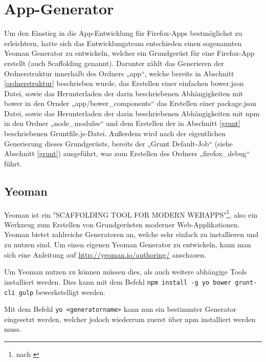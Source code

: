 \renewcommand{\chaptertitle}{App-Generator}

\chapter{\chaptertitle} %

\label{AppGenerator} %


Um den Einstieg in die App-Entwicklung für Firefox-Apps bestmöglichst zu erleichtern, hatte sich das Entwicklungsteam entschieden einen sogenannten Yeoman Generator zu entwickeln, welcher ein Grundgerüst für eine Firefox-App erstellt (auch Scaffolding genannt).
Darunter zählt das Generieren der Ordnerstruktur innerhalb des Ordners „app“, welche bereits in Abschnitt \ref{ordnerstruktur} beschrieben wurde, das Erstellen einer einfachen bower.json Datei, sowie das Herunterladen der darin beschriebenen Abhängigkeiten mit bower in den Ornder „app/bower\_components“ das Erstellen einer package.json Datei, sowie das Herunterladen der darin beschriebenen Abhängigkeiten mit npm in den Ordner „node\_modules“ und dem Erstellen der in Abschnitt \ref{grunt} beschriebenen Gruntfile.js-Datei.
Außerdem wird nach der eigentlichen Generierung dieses Grundgerüsts, bereits der „Grunt Default-Job“ (siehe Abschnitt \ref{grunt}) ausgeführt, was zum Erstellen des Ordners „firefox\_debug“ führt.

\section{Yeoman}

Yeoman ist ein "{}SCAFFOLDING TOOL FOR MODERN WEBAPPS"{}\footnote{nach \cite{yeoman}}, also ein Werkzeug zum Erstellen von Grundgerüsten moderner Web-Applikationen.
Yeoman bietet zahlreiche Generatoren an, welche sehr einfach zu installieren und zu nutzen sind.
Um einen eigenen Yeoman Generator zu entwickeln, kann man sich eine Anleitung auf \url{http://yeoman.io/authoring/} anschauen.

Um Yeoman nutzen zu können müssen dies, als auch weitere abhängige Tools installiert werden.
Dies kann mit dem Befehl \texttt{npm install -g yo bower grunt-cli gulp} bewerkstelligt werden.

Mit dem Befehl \texttt{yo <generatorname>} kann nun ein bestimmter Generator eingesetzt werden, welcher jedoch wiederrum zuerst über npm installiert werden muss.

